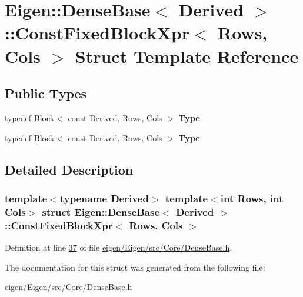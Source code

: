 \hypertarget{struct_eigen_1_1_dense_base_1_1_const_fixed_block_xpr}{}\section{Eigen\+:\+:Dense\+Base$<$ Derived $>$\+:\+:Const\+Fixed\+Block\+Xpr$<$ Rows, Cols $>$ Struct Template Reference}
\label{struct_eigen_1_1_dense_base_1_1_const_fixed_block_xpr}
\subsection*{Public Types}
\begin{DoxyCompactItemize}
\item 
\mbox{\label{struct_eigen_1_1_dense_base_1_1_const_fixed_block_xpr_a83a94551dfc89f107fdf64b50395f6db}} 
typedef \hyperlink{group___core___module_class_eigen_1_1_block}{Block}$<$ const Derived, Rows, Cols $>$ {\bfseries Type}
\item 
\mbox{\label{struct_eigen_1_1_dense_base_1_1_const_fixed_block_xpr_a83a94551dfc89f107fdf64b50395f6db}} 
typedef \hyperlink{group___core___module_class_eigen_1_1_block}{Block}$<$ const Derived, Rows, Cols $>$ {\bfseries Type}
\end{DoxyCompactItemize}


\subsection{Detailed Description}
\subsubsection*{template$<$typename Derived$>$\newline
template$<$int Rows, int Cols$>$\newline
struct Eigen\+::\+Dense\+Base$<$ Derived $>$\+::\+Const\+Fixed\+Block\+Xpr$<$ Rows, Cols $>$}



Definition at line \hyperlink{eigen_2_eigen_2src_2_core_2_dense_base_8h_source_l00037}{37} of file \hyperlink{eigen_2_eigen_2src_2_core_2_dense_base_8h_source}{eigen/\+Eigen/src/\+Core/\+Dense\+Base.\+h}.



The documentation for this struct was generated from the following file\+:\begin{DoxyCompactItemize}
\item 
eigen/\+Eigen/src/\+Core/\+Dense\+Base.\+h\end{DoxyCompactItemize}
